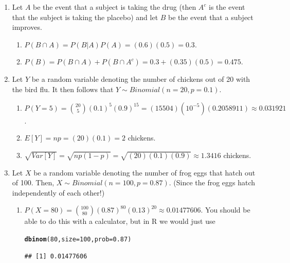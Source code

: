 \documentclass{article}\usepackage[]{graphicx}\usepackage[]{color}
\makeatletter
\newcommand{\hlnum}[1]{\textcolor[rgb]{0.686,0.059,0.569}{#1}}%
\newcommand{\hlstd}[1]{\textcolor[rgb]{0.345,0.345,0.345}{#1}}%
\newcommand{\hlkwc}[1]{\textcolor[rgb]{0.333,0.667,0.333}{#1}}%
\newcommand{\hlkwd}[1]{\textcolor[rgb]{0.737,0.353,0.396}{\textbf{#1}}}%
\newenvironment{kframe}{%
 \def\at@end@of@kframe{}%
 \ifinner\ifhmode%
  \def\at@end@of@kframe{\end{minipage}}%
  \begin{minipage}{\columnwidth}%
 \fi\fi%
 \def\FrameCommand##1{\hskip\@totalleftmargin \hskip-\fboxsep
 \colorbox{shadecolor}{##1}\hskip-\fboxsep
     \hskip-\linewidth \hskip-\@totalleftmargin \hskip\columnwidth}%
 \MakeFramed {\advance\hsize-\width
   \@totalleftmargin\z@ \linewidth\hsize
   \@setminipage}}%
 {\par\unskip\endMakeFramed%
 \at@end@of@kframe}
\newenvironment{knitrout}{}{} %
\makeatother
\begin{document}
\begin{enumerate}
  \item Let $A$ be the event that a subject is taking the drug (then $A^c$ is the event that the subject is taking the placebo) and let $B$ be the event that a subject improves.
  
  \begin{enumerate}
  
    \item $P\left(B \cap A\right) = P\left(B | A\right)P\left(A\right) = (0.6)(0.5) = 0.3$.
    \item $P\left(B\right) = P\left(B \cap A\right) + P\left(B \cap A^c\right) = 0.3 + (0.35)(0.5) = 0.475$.
  
  \end{enumerate}
  
  \item Let $Y$ be a random variable denoting the number of chickens out of 20 with the bird flu. It then follows that $Y \sim Binomial\left(n = 20, p = 0.1\right)$.
  
  \begin{enumerate}
  
    \item $P\left(Y = 5\right) = \binom{20}{5}(0.1)^5(0.9)^15 = (15504)\left(10^{-5}\right)(0.2058911) \approx 0.031921$.
    
    \item $E\left[Y\right] = np = (20)(0.1) = 2$ chickens.
    
    \item $\sqrt{Var\left[Y\right]} = \sqrt{np(1-p)} = \sqrt{(20)(0.1)(0.9)} \approx 1.3416$ chickens.
  
  \end{enumerate}
  
  \item Let $X$ be a random variable denoting the number of frog eggs that hatch out of 100. Then, $X \sim Binomial\left(n = 100, p = 0.87\right)$. (Since the frog eggs hatch independently of each other!)
  
  \begin{enumerate}
  
    \item $P\left(X = 80\right) = \binom{100}{80}(0.87)^{80}(0.13)^{20} \approx 0.01477606$. You should be able to do this with a calculator, but in R we would just use
\begin{knitrout}
\color{fgcolor}\begin{kframe}
\begin{alltt}
\hlkwd{dbinom}\hlstd{(}\hlnum{80}\hlstd{,} \hlkwc{size} \hlstd{=} \hlnum{100}\hlstd{,} \hlkwc{prob} \hlstd{=} \hlnum{0.87}\hlstd{)}
\end{alltt}
\begin{verbatim}
## [1] 0.01477606
\end{verbatim}
\end{kframe}
\end{knitrout}
  

\end{enumerate}
\end{enumerate}
\end{document}
